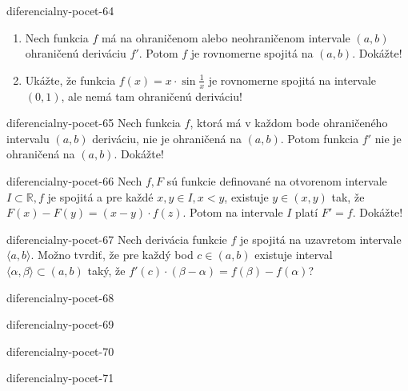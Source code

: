 \begin{defproblem}{diferencialny-pocet-64}
\begin{enumerate}
\item Nech funkcia $f$ má na ohraničenom alebo neohraničenom intervale $(a,b)$ ohraničenú deriváciu $f'$. Potom $f$ je rovnomerne spojitá na $(a,b)$. Dokážte!
\item Ukážte, že funkcia $f(x)=x\cdot \sin \frac{1}{x}$ je rovnomerne spojitá na intervale $(0,1)$, ale nemá tam ohraničenú deriváciu!
\end{enumerate}
\end{defproblem}

\begin{defproblem}{diferencialny-pocet-65}
Nech funkcia $f$, ktorá má v každom bode ohraničeného intervalu $(a,b)$ deriváciu, nie je ohraničená na $(a,b)$. Potom funkcia $f'$ nie je ohraničená na $(a,b)$. Dokážte!
\end{defproblem}

\begin{defproblem}{diferencialny-pocet-66}
Nech $f,F$ sú funkcie definované na otvorenom intervale $I \subset \mathbb{R},f$ je spojitá a pre každé $x,y\in I,x<y$, existuje $y\in (x,y)$ tak, že $F(x)-F(y)=(x-y)\cdot f(z)$. Potom na intervale $I$ platí $F'=f$. Dokážte!
\end{defproblem}

\begin{defproblem}{diferencialny-pocet-67}
Nech derivácia funkcie $f$ je spojitá na uzavretom intervale $\langle a,b \rangle$. Možno tvrdiť, že pre každý bod $c\in (a,b)$ existuje interval $\langle \alpha,\beta \rangle \subset (a,b)$ taký, že $f'(c)\cdot (\beta-\alpha)=f(\beta)-f(\alpha)$?
\end{defproblem}

\begin{defproblem}{diferencialny-pocet-68}

\end{defproblem}

\begin{defproblem}{diferencialny-pocet-69}

\end{defproblem}

\begin{defproblem}{diferencialny-pocet-70}

\end{defproblem}

\begin{defproblem}{diferencialny-pocet-71}

\end{defproblem}

